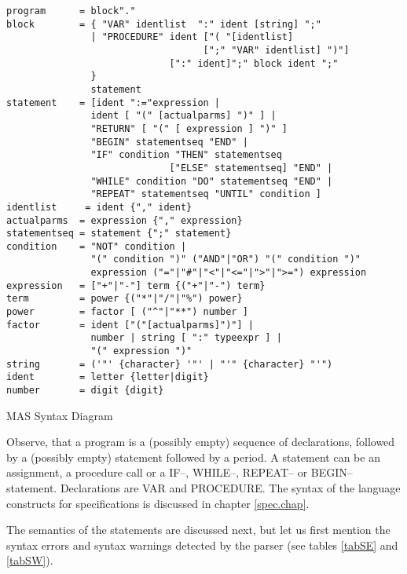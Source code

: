 \begin{table}
\begin{center}
\begin{verbatim}
program      = block"."
block        = { "VAR" identlist  ":" ident [string] ";"
               | "PROCEDURE" ident ["( "[identlist]
                                   [";" "VAR" identlist] ")"]
                             [":" ident]";" block ident ";"
               }
               statement
statement    = [ident ":="expression |
               ident [ "(" [actualparms] ")" ] |
               "RETURN" [ "(" [ expression ] ")" ]
               "BEGIN" statementseq "END" |
               "IF" condition "THEN" statementseq 
                             ["ELSE" statementseq] "END" |
               "WHILE" condition "DO" statementseq "END" |
               "REPEAT" statementseq "UNTIL" condition ]
identlist     = ident {"," ident}
actualparms  = expression {"," expression}
statementseq = statement {";" statement}
condition    = "NOT" condition |
               "(" condition ")" ("AND"|"OR") "(" condition ")" 
               expression ("="|"#"|"<"|"<="|">"|">=") expression
expression   = ["+"|"-"] term {("+"|"-") term}
term         = power {("*"|"/"|"%") power}
power        = factor [ ("^"|"**") number ]
factor       = ident ["("[actualparms]")"] |
               number | string [ ":" typeexpr ] |
               "(" expression ")"
string       = ('"' {character} '"' | "'" {character} "'")
ident        = letter {letter|digit}
number       = digit {digit}
\end{verbatim}
\end{center}
\label{tabSD}
\caption{MAS Syntax Diagram}
\end{table}

Observe, that a program is a (possibly empty) sequence of 
declarations, followed by a (possibly empty) statement
followed by a period.
A statement can be an assignment, a procedure call or
a IF--, WHILE--, REPEAT-- or BEGIN--statement.
Declarations are VAR and PROCEDURE. 
The syntax of the language constructs for specifications 
is discussed in chapter \ref{spec.chap}. 

The semantics of the statements are discussed next, but
let us first mention the syntax errors and syntax warnings 
detected by the parser
(see tables \ref{tabSE} and \ref{tabSW}).

